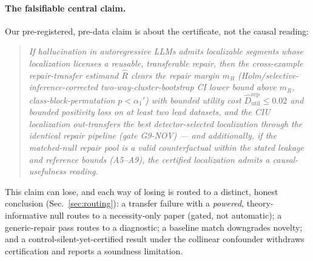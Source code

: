 \documentclass[11pt]{article}
\theoremstyle{plain}
\theoremstyle{definition}
\newcommand{\Rhat}{\widehat{R}}
\newcommand{\Dutilr}{\widehat{D}^{\mathrm{rep}}_{\mathrm{util}}}
\begin{document}
\paragraph{The falsifiable central claim.} Our pre-registered, pre-data claim is
about the certificate, not the causal reading:
\begin{quote}\itshape
If hallucination in autoregressive LLMs admits localizable segments whose
localization licenses a reusable, transferable repair, then the cross-example
repair-transfer estimand $\Rhat$ clears the repair margin $m_R$
(Holm/selective-inference-corrected two-way-cluster-bootstrap CI lower bound above
$m_R$, class-block-permutation $p<\alpha_1'$) with bounded utility cost
$\Dutilr\le0.02$ and bounded positivity loss on at least two lead datasets, and
the CIU localization out-transfers the best detector-selected localization through
the identical repair pipeline (gate G9-NOV) --- and \emph{additionally}, if the
matched-null repair pool is a valid counterfactual within the stated leakage and
reference bounds (A5--A9), the certified localization admits a causal-usefulness
reading.
\end{quote}
This claim can lose, and each way of losing is routed to a distinct, honest
conclusion (Sec.~\ref{sec:routing}): a transfer failure with a \emph{powered},
theory-informative null routes to a necessity-only paper (gated, not automatic); a
generic-repair pass routes to a diagnostic; a baseline match downgrades novelty;
and a control-silent-yet-certified result under the collinear confounder withdraws
certification and reports a soundness limitation.
\end{document}
